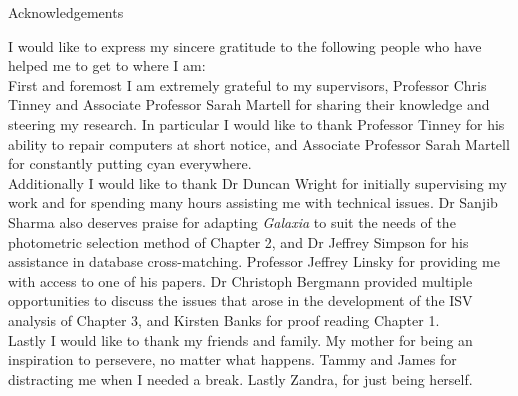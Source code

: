 \begin{Large}
\centering
Acknowledgements\\
\end{Large}
\vspace{2cm}
I would like to express my sincere gratitude to the following people who have helped me to get to where I am:\\

First and foremost I am extremely grateful to my supervisors, Professor Chris Tinney and Associate Professor Sarah Martell for sharing their knowledge and steering my research. In particular I would like to thank Professor Tinney for his ability to repair computers at short notice, and Associate Professor Sarah Martell for constantly putting cyan everywhere.\\

Additionally I would like to thank Dr Duncan Wright for initially supervising my work and for spending many hours assisting me with technical issues. Dr Sanjib Sharma also deserves praise for adapting {\em Galaxia} to suit the needs of the photometric selection method of Chapter 2, and Dr Jeffrey Simpson for his assistance in database cross-matching. Professor Jeffrey Linsky for providing me with access to one of his papers. Dr Christoph Bergmann provided multiple opportunities to discuss the issues that arose in the development of the ISV analysis of Chapter 3, and Kirsten Banks for proof reading Chapter 1.\\

Lastly I would like to thank my friends and family. My mother for being an inspiration to persevere, no matter what happens. Tammy and James for distracting me when I needed a break. Lastly Zandra, for just being herself.